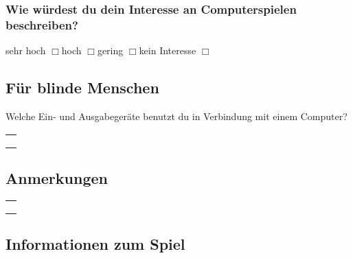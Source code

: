 \documentclass[10pt, a4paper,onecolumn]{article}
\begin{document}
\subsubsection*{Wie würdest du dein Interesse an Computerspielen beschreiben?}\noindent
sehr hoch $\Box{}$\hspace{0.5cm}hoch $\Box{}$\hspace{0.5cm}gering
$\Box{}$\hspace{0.5cm}kein Interesse $\Box{}$

\subsection*{Für blinde Menschen}
\noindent
Welche Ein- und Ausgabegeräte benutzt du in Verbindung mit einem Computer?
\begin{table}[h]
\begin{tabular}{p{\textwidth}}
\\
\hline
\\
\hline
\\
\hline
\\
\hline
\\
\hline
\end{tabular}
\end{table}


\subsection*{Anmerkungen}
\begin{table}[h]
\begin{tabular}{p{\textwidth}}
\\
\hline
\\
\hline
\\
\hline
\\
\hline
\\
\hline
\end{tabular}
\end{table}

\newpage
\subsection*{Informationen zum Spiel}
\end{document}
